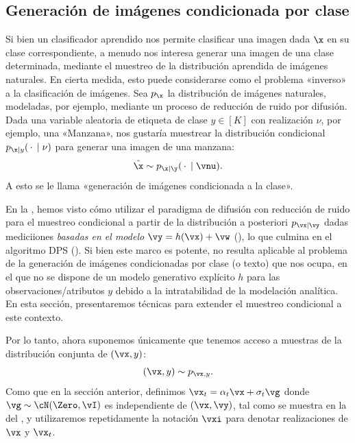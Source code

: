 \documentclass[../../book-main_es.tex]{subfiles}
\begin{document}
\subsection{Generación de imágenes condicionada por clase}\label{sub:cfg}
Si bien un clasificador aprendido nos permite clasificar una imagen dada $\x$ en su
clase correspondiente, a menudo nos interesa generar una imagen de una
clase determinada, mediante
el muestreo de la distribución aprendida de imágenes naturales. En cierta medida, esto puede
considerarse como el problema «inverso» a la clasificación de imágenes. Sea $p_{\x}$ la
distribución de imágenes naturales, modeladas, por ejemplo, mediante un proceso de
reducción de ruido por difusión. Dada una variable aleatoria de etiqueta de clase $y \in [K]$ con
realización $\nu$, por ejemplo,
una «Manzana», nos gustaría muestrear la distribución condicional $p_{\x \mid
y}(\,\cdot\, \mid \nu)$ para generar una imagen de una manzana:
\begin{equation}
    \hat{\x} \sim p_{\x\mid \y}(\,\cdot\, \mid \vnu).
\end{equation}
A esto se le llama «generación de imágenes condicionada a la clase».

En la , hemos visto cómo utilizar el
paradigma de difusión con reducción de ruido para el
muestreo condicional a partir de la distribución a posteriori $p_{\vx \mid \vy}$ dadas
mediciiones \textit{basadas en el modelo} $\vy = h(\vx) + \vw$
(), lo que culmina en el
algoritmo DPS (). Si bien este marco
es potente, no resulta aplicable al problema de la generación de imágenes condicionadas por clase (o texto)
que nos ocupa, en el que no se dispone de un modelo generativo explícito $h$ para las
observaciones/atributos $y$ debido a la intratabilidad
de la modelación analítica. En esta sección,
presentaremos técnicas para extender
el muestreo condicional a este contexto.

Por lo tanto, ahora suponemos únicamente que tenemos acceso a muestras de la distribución conjunta
de $(\vx, y)$:
\begin{equation}
    (\vx, y) \sim p_{\vx, y}.
\end{equation}
Como que en la sección anterior, definimos $\vx_t = \alpha_t \vx + \sigma_t \vg$
donde $\vg \sim \cN(\Zero, \vI)$ es independiente de $(\vx, \vy)$, tal como se muestra en la
 del ,
y utilizaremos repetidamente la notación $\vxi$ para denotar realizaciones de $\vx$
y $\vx_t$.
\end{document}
